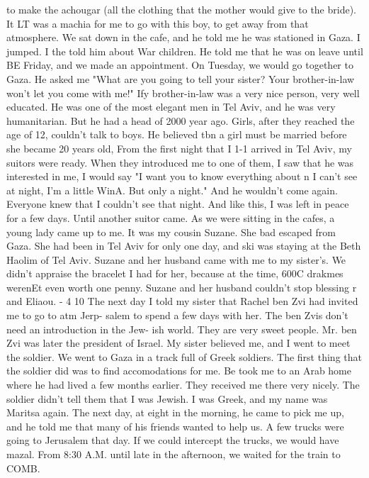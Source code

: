 to make the achougar (all the clothing that the mother would give to the bride).
It LT 
was a machia for me to go with this boy, to get away from that atmosphere.
We sat down in the cafe, and he told me he was stationed in Gaza.
I jumped.
I 
the 
told him about War children.
He told me that he was on leave until BE Friday, and we 
made an appointment.
On Tuesday, we would go together to Gaza.
He asked me "What are 
you going to tell your sister?
Your brother-in-law won't let you come with me!"
Ify 
brother-in-law was a very nice person, very well educated.
He was one of the most 
elegant men in Tel Aviv, and he was very humanitarian.
But he had a head of 2000 year 
ago.
Girls, after they reached the age of 12, couldn't talk to boys.
He believed tbn 
a girl must be married before she became 20 years old, From the first night that I 1-1 
arrived in Tel Aviv, my suitors were ready.
When they introduced me to one of them, 
I saw that he was interested in me, I would say "I want you to know everything about n 
I can't see at night, I'm a little WinA.
But only a night."
And he wouldn't come 
again.
Everyone knew that I couldn't see that night.
And like this, I was left in 
peace for a few days.
Until another suitor came.
As we were sitting in the cafes, a young lady came up to me.
It was my cousin 
Suzane.
She bad escaped from Gaza.
She had been in Tel Aviv for only one day, and ski 
was staying at the Beth Haolim of Tel Aviv.
Suzane and her husband came with me to 
my sister's.
We didn't appraise the bracelet I had for her, because at the time, 600C 
drakmes werenEt even worth one penny.
Suzane and her husband couldn't stop blessing r 
and Eliaou.
- 4 
10 
The next day I told my sister that Rachel ben Zvi had invited me to go to atm Jerp-
salem to spend a few days with her.
The ben Zvis don't need an introduction in the Jew-
ish world.
They are very sweet people.
Mr.
ben Zvi was later the president of Israel.
My sister believed me, and I went to meet the soldier.
We went to Gaza in a track full of Greek soldiers.
The first thing that the soldier 
did was to find accomodations for me.
Be took me to an Arab home where he had lived a 
few months earlier.
They received me there very nicely.
The soldier didn't tell them 
that I was Jewish.
I was Greek, and my name was Maritsa again.
The next day, at eight in 
the morning, he came to pick me up, and he told me that many of his friends wanted to help 
us.
A few trucks were going to Jerusalem that day.
If we could intercept the trucks, we 
would have mazal.
From 8:30 A.M.
until late in the afternoon, we waited for the train to COMB.
